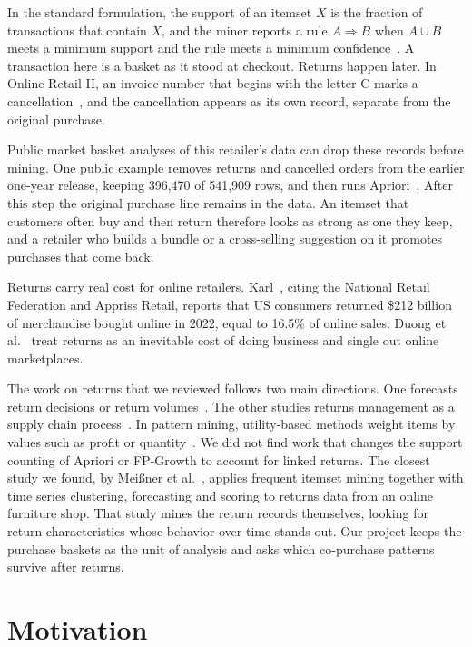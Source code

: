 \documentclass[11pt,a4paper]{article}
\begin{document}
In the standard formulation, the support of an itemset $X$ is the fraction of transactions that contain $X$, and the miner reports a rule $A \Rightarrow B$ when $A \cup B$ meets a minimum support and the rule meets a minimum confidence~\cite{agrawal1994}. A transaction here is a basket as it stood at checkout. Returns happen later. In Online Retail II, an invoice number that begins with the letter C marks a cancellation~\cite{uci_oretail2}, and the cancellation appears as its own record, separate from the original purchase.

Public market basket analyses of this retailer's data can drop these records before mining. One public example removes returns and cancelled orders from the earlier one-year release, keeping 396,470 of 541,909 rows, and then runs Apriori~\cite{gh_mba}. After this step the original purchase line remains in the data. An itemset that customers often buy and then return therefore looks as strong as one they keep, and a retailer who builds a bundle or a cross-selling suggestion on it promotes purchases that come back.

Returns carry real cost for online retailers. Karl~\cite{karl2025}, citing the National Retail Federation and Appriss Retail, reports that US consumers returned \$212 billion of merchandise bought online in 2022, equal to 16.5\% of online sales. Duong et al.~\cite{duong2022} treat returns as an inevitable cost of doing business and single out online marketplaces.

The work on returns that we reviewed follows two main directions. One forecasts return decisions or return volumes~\cite{karl2025,li2018,shang2020}. The other studies returns management as a supply chain process~\cite{ambilkar2022}. In pattern mining, utility-based methods weight items by values such as profit or quantity~\cite{gan2021}. We did not find work that changes the support counting of Apriori or FP-Growth to account for linked returns. The closest study we found, by Mei{\ss}ner et al.~\cite{meissner2022}, applies frequent itemset mining together with time series clustering, forecasting and scoring to returns data from an online furniture shop. That study mines the return records themselves, looking for return characteristics whose behavior over time stands out. Our project keeps the purchase baskets as the unit of analysis and asks which co-purchase patterns survive after returns.

\section*{Motivation}
\end{document}
